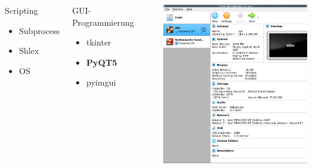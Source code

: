 \documentclass{beamer}
\begin{document}
\begin{frame}
\begin{center}
\begin{columns}[onlytextwidth,T]
\column{\dimexpr\linewidth-65mm-5mm}
\begin{block}{Scripting}
\begin{itemize}
\item Subprocess
\item Shlex
\item OS
\end{itemize}
\end{block}
\begin{block}{GUI-Programmierung}
\begin{itemize}
\item tkinter
\item \textbf{PyQT5}
\item pyimgui
\end{itemize}
\end{block}
\column{65mm}
\includegraphics[width=65mm]{./assets/vb.png}
\end{columns}
\end{center}
\end{frame}
\end{document}
